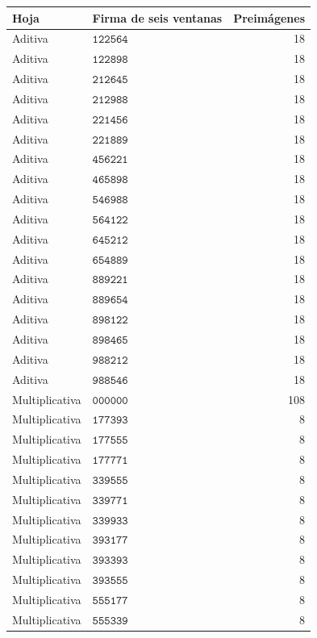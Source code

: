 \begin{table}[!htbp]\centering\fontsize{9}{10.4}\selectfont\renewcommand{\arraystretch}{1.02}\begin{tabular}{@{}llr@{}}
\toprule Hoja&Firma de seis ventanas&Preimágenes\\\midrule
Aditiva&\(\mathtt{122564}\)&18\\
Aditiva&\(\mathtt{122898}\)&18\\
Aditiva&\(\mathtt{212645}\)&18\\
Aditiva&\(\mathtt{212988}\)&18\\
Aditiva&\(\mathtt{221456}\)&18\\
Aditiva&\(\mathtt{221889}\)&18\\
Aditiva&\(\mathtt{456221}\)&18\\
Aditiva&\(\mathtt{465898}\)&18\\
Aditiva&\(\mathtt{546988}\)&18\\
Aditiva&\(\mathtt{564122}\)&18\\
Aditiva&\(\mathtt{645212}\)&18\\
Aditiva&\(\mathtt{654889}\)&18\\
Aditiva&\(\mathtt{889221}\)&18\\
Aditiva&\(\mathtt{889654}\)&18\\
Aditiva&\(\mathtt{898122}\)&18\\
Aditiva&\(\mathtt{898465}\)&18\\
Aditiva&\(\mathtt{988212}\)&18\\
Aditiva&\(\mathtt{988546}\)&18\\
Multiplicativa&\(\mathtt{000000}\)&108\\
Multiplicativa&\(\mathtt{177393}\)&8\\
Multiplicativa&\(\mathtt{177555}\)&8\\
Multiplicativa&\(\mathtt{177771}\)&8\\
Multiplicativa&\(\mathtt{339555}\)&8\\
Multiplicativa&\(\mathtt{339771}\)&8\\
Multiplicativa&\(\mathtt{339933}\)&8\\
Multiplicativa&\(\mathtt{393177}\)&8\\
Multiplicativa&\(\mathtt{393393}\)&8\\
Multiplicativa&\(\mathtt{393555}\)&8\\
Multiplicativa&\(\mathtt{555177}\)&8\\
Multiplicativa&\(\mathtt{555339}\)&8\\

\end{tabular}
\end{table}
